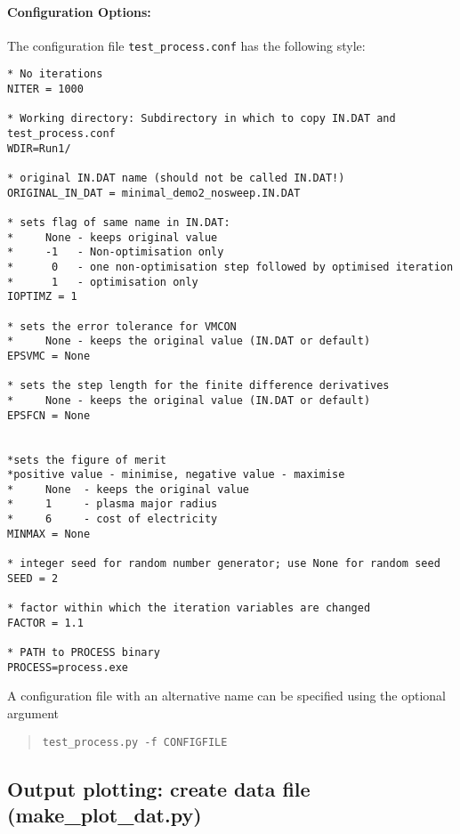 \paragraph{Configuration Options:}

The configuration file \texttt{test\_process.conf} has the following style:
\begin{framed}
\begin{verbatim}
* No iterations
NITER = 1000

* Working directory: Subdirectory in which to copy IN.DAT and test_process.conf
WDIR=Run1/

* original IN.DAT name (should not be called IN.DAT!)
ORIGINAL_IN_DAT = minimal_demo2_nosweep.IN.DAT

* sets flag of same name in IN.DAT: 
*     None - keeps original value
*     -1   - Non-optimisation only
*      0   - one non-optimisation step followed by optimised iteration
*      1   - optimisation only
IOPTIMZ = 1

* sets the error tolerance for VMCON 
*     None - keeps the original value (IN.DAT or default)
EPSVMC = None

* sets the step length for the finite difference derivatives
*     None - keeps the original value (IN.DAT or default)
EPSFCN = None
 

*sets the figure of merit 
*positive value - minimise, negative value - maximise
*     None  - keeps the original value
*     1     - plasma major radius
*     6	    - cost of electricity
MINMAX = None

* integer seed for random number generator; use None for random seed
SEED = 2

* factor within which the iteration variables are changed
FACTOR = 1.1

* PATH to PROCESS binary
PROCESS=process.exe
\end{verbatim}
\end{framed}

A configuration file with an alternative name can be specified using the optional argument
\begin{quote}
\begin{verbatim}
test_process.py -f CONFIGFILE
\end{verbatim}
\end{quote}


\subsection{Output plotting: create data file (make\_plot\_dat.py)}

